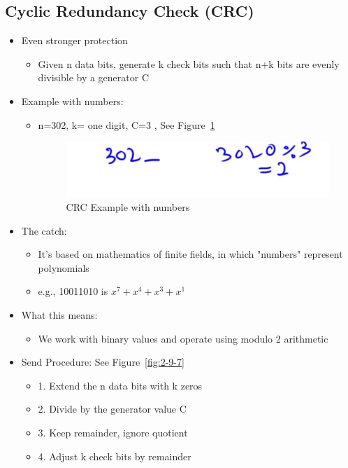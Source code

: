 \documentclass[12pt]{ctexart}   %
\begin{document}
	\subsection{Cyclic Redundancy Check (CRC)}
	\begin{itemize}
		\item Even stronger protection
		\begin{itemize}
			\item Given n data bits, generate k check bits such that n+k bits are evenly divisible by a generator C
		\end{itemize}
		
		\item Example with numbers:
		\begin{itemize}
			\item n=302, k= one digit, C=3 , See Figure~\ref{fig:2-9-6}
			
			\begin{figure}[h!] %
			\centering
			 \includegraphics[scale=0.7]{images/2-9-6}
			\caption{CRC Example with numbers}
			 \label{fig:2-9-6}
			 \end{figure}
		 
		\end{itemize}
		
		\item The catch:
		\begin{itemize}
			\item It's based on mathematics of finite fields, in which "numbers" represent polynomials
			\item e.g., 10011010 is $x^7 + x^4 + x^3 + x^1$
		\end{itemize}
		
		\item What this means:
		\begin{itemize}
			\item We work with binary values and operate using modulo 2 arithmetic
		\end{itemize}

		\item Send Procedure:        See Figure~\ref{fig:2-9-7}
		\begin{itemize}
			\item {\color{blue} 1.} Extend the n data bits with k zeros
			\item {\color{blue} 2.} Divide by the generator value C
			\item {\color{blue} 3.} Keep remainder, ignore quotient
			\item {\color{blue} 4.} Adjust k check bits by remainder
		\end{itemize}
		

\end{itemize}
\end{document}
